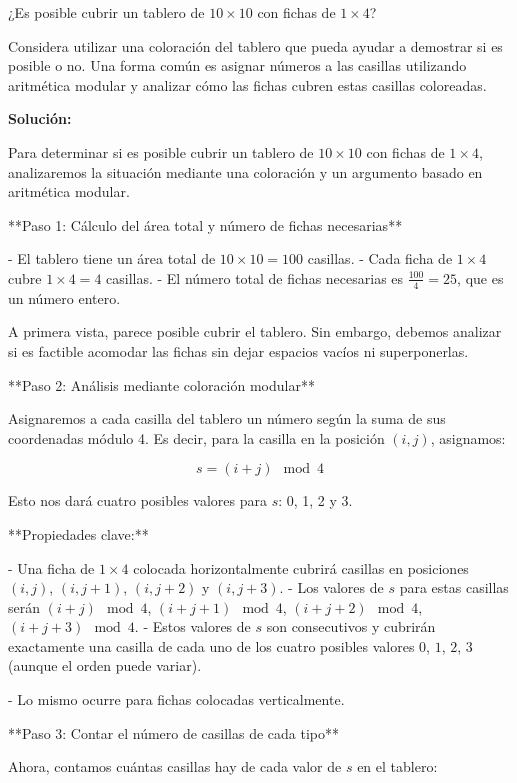 \documentclass[11pt]{scrartcl}
\begin{document}
\begin{problem}
¿Es posible cubrir un tablero de $10 \times 10$ con fichas de $1 \times 4$?

\begin{hint}
Considera utilizar una coloración del tablero que pueda ayudar a demostrar si es posible o no. Una forma común es asignar números a las casillas utilizando aritmética modular y analizar cómo las fichas cubren estas casillas coloreadas.

\begin{solu}
\textbf{Solución:}

Para determinar si es posible cubrir un tablero de $10 \times 10$ con fichas de $1 \times 4$, analizaremos la situación mediante una coloración y un argumento basado en aritmética modular.

**Paso 1: Cálculo del área total y número de fichas necesarias**

- El tablero tiene un área total de $10 \times 10 = 100$ casillas.
- Cada ficha de $1 \times 4$ cubre $1 \times 4 = 4$ casillas.
- El número total de fichas necesarias es $\frac{100}{4} = 25$, que es un número entero.

A primera vista, parece posible cubrir el tablero. Sin embargo, debemos analizar si es factible acomodar las fichas sin dejar espacios vacíos ni superponerlas.

**Paso 2: Análisis mediante coloración modular**

Asignaremos a cada casilla del tablero un número según la suma de sus coordenadas módulo 4. Es decir, para la casilla en la posición $(i, j)$, asignamos:

$$
s = (i + j) \mod 4
$$

Esto nos dará cuatro posibles valores para $s$: 0, 1, 2 y 3.

**Propiedades clave:**

- Una ficha de $1 \times 4$ colocada horizontalmente cubrirá casillas en posiciones $(i, j)$, $(i, j+1)$, $(i, j+2)$ y $(i, j+3)$.
  - Los valores de $s$ para estas casillas serán $(i + j) \mod 4$, $(i + j + 1) \mod 4$, $(i + j + 2) \mod 4$, $(i + j + 3) \mod 4$.
  - Estos valores de $s$ son consecutivos y cubrirán exactamente una casilla de cada uno de los cuatro posibles valores $0$, $1$, $2$, $3$ (aunque el orden puede variar).

- Lo mismo ocurre para fichas colocadas verticalmente.

**Paso 3: Contar el número de casillas de cada tipo**

Ahora, contamos cuántas casillas hay de cada valor de $s$ en el tablero:


\end{solu}
\end{hint}
\end{problem}
\end{document}
